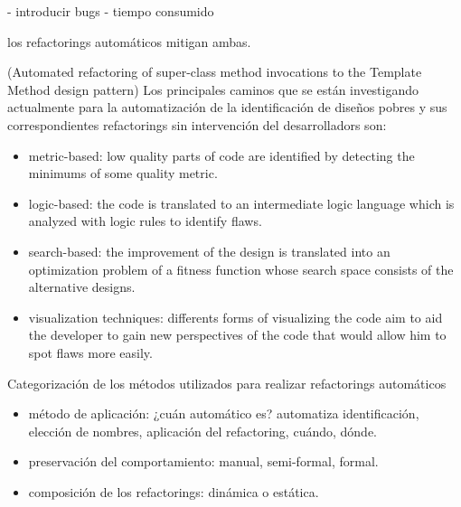 - introducir bugs - tiempo consumido

los refactorings automáticos mitigan ambas.

(Automated refactoring of super-class method invocations to the Template Method design pattern) Los
principales caminos que se están investigando actualmente para la automatización de la
identificación de diseños pobres y sus correspondientes refactorings sin intervención del
desarrolladors son:

\begin{itemize}
    \item metric-based: low quality parts of code are identified by detecting the minimums of some
    quality metric.
    \item logic-based: the code is translated to an intermediate logic language which is analyzed
    with logic rules to identify flaws.
    \item search-based: the improvement of the design is translated into an optimization problem of
    a fitness function whose search space consists of the alternative designs.
    \item visualization techniques: differents forms of visualizing the code aim to aid the
    developer to gain new perspectives of the code that would allow him to spot flaws more easily.
\end{itemize}

Categorización de los métodos utilizados para realizar refactorings automáticos

\begin{itemize}
    \item método de aplicación: ¿cuán automático es? automatiza identificación, elección de nombres, aplicación del refactoring, cuándo, dónde.
    \item preservación del comportamiento: manual, semi-formal, formal.
    \item composición de los refactorings: dinámica o estática.
\end{itemize}

